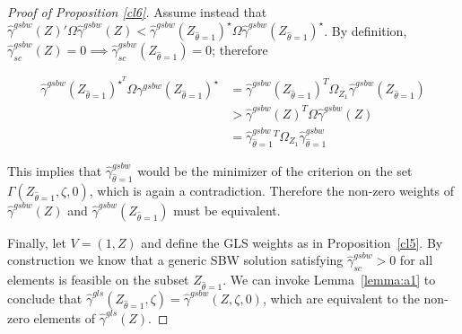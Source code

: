 \begin{proof}[Proof of Proposition \ref{cl6}]
Assume instead that $\hat{\gamma}^{gsbw}(Z)'\Omega\hat{\gamma}^{gsbw}(Z) < \hat{\gamma}^{gsbw}(Z_{\hat{\theta} = 1})^\star \Omega\hat{\gamma}^{gsbw}(Z_{\hat{\theta} = 1})^\star$. By definition, $\hat{\gamma}^{gsbw}_{sc}(Z) = 0 \implies \hat{\gamma}^{gsbw}_{sc}(Z_{\hat{\theta} = 1}) = 0$; therefore 

\begin{align*}
\hat{\gamma}^{gsbw}(Z_{\hat{\theta} = 1})^\star^T\Omega\gamma^{gsbw}(Z_{\hat{\theta} = 1})^\star &= \hat{\gamma}^{gsbw}(Z_{\hat{\theta} = 1})^T\Omega_{Z_1}\hat{\gamma}^{gsbw}(Z_{\hat{\theta} = 1}) \\
&> \hat{\gamma}^{gsbw}(Z)^T\Omega\hat{\gamma}^{gsbw}(Z) \\
&= \hat{\gamma}^{gsbw}_{\hat{\theta} = 1}^T\Omega_{Z_1}\hat{\gamma}^{gsbw}_{\hat{\theta} = 1}    
\end{align*}

This implies that $\hat{\gamma}^{gsbw}_{\hat{\theta} = 1}$ would be the minimizer of the criterion on the set $\Gamma(Z_{\hat{\theta} = 1}, \zeta, 0)$, which is again a contradiction. Therefore the non-zero weights of $\hat{\gamma}^{gsbw}(Z)$ and $\hat{\gamma}^{gsbw}(Z_{\hat{\theta} =1})$ must be equivalent.

Finally, let $V = (1, Z)$ and define the GLS weights as in Proposition~\ref{cl5}. By construction we know that a generic SBW solution satisfying $\hat{\gamma}_{sc}^{gsbw} > 0$ for all elements is feasible on the subset $Z_{\hat{\theta} = 1}$. We can invoke Lemma~\ref{lemma:a1} to conclude that $\hat{\gamma}^{gls}(Z_{\hat{\theta} = 1}, \zeta) = \hat{\gamma}^{gsbw}(Z, \zeta, 0)$, which are equivalent to the non-zero elements of $\hat{\gamma}^{gls}(Z)$. 
\end{proof}
